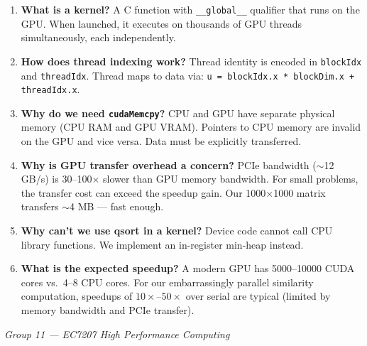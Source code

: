 \documentclass[12pt,a4paper]{article}
\begin{document}
\begin{enumerate}
    \item \textbf{What is a kernel?}  A C function with \texttt{\_\_global\_\_}
          qualifier that runs on the GPU.  When launched, it executes on
          thousands of GPU threads simultaneously, each independently.
    \item \textbf{How does thread indexing work?}  Thread identity is encoded
          in \texttt{blockIdx} and \texttt{threadIdx}.  Thread maps to data
          via: \texttt{u = blockIdx.x * blockDim.x + threadIdx.x}.
    \item \textbf{Why do we need \texttt{cudaMemcpy}?}  CPU and GPU have
          separate physical memory (CPU RAM and GPU VRAM).  Pointers to CPU
          memory are invalid on the GPU and vice versa.  Data must be
          explicitly transferred.
    \item \textbf{Why is GPU transfer overhead a concern?}  PCIe bandwidth
          ($\sim$12 GB/s) is 30--100$\times$ slower than GPU memory bandwidth.
          For small problems, the transfer cost can exceed the speedup gain.
          Our 1000$\times$1000 matrix transfers $\sim$4 MB — fast enough.
    \item \textbf{Why can't we use qsort in a kernel?}  Device code cannot call
          CPU library functions.  We implement an in-register min-heap instead.
    \item \textbf{What is the expected speedup?}  A modern GPU has
          5000--10000 CUDA cores vs.\ 4--8 CPU cores.  For our embarrassingly
          parallel similarity computation, speedups of $10\times$--$50\times$
          over serial are typical (limited by memory bandwidth and PCIe transfer).
\end{enumerate}

\vfill
\begin{center}
    \small\textit{Group 11 — EC7207 High Performance Computing}
\end{center}
\end{document}
